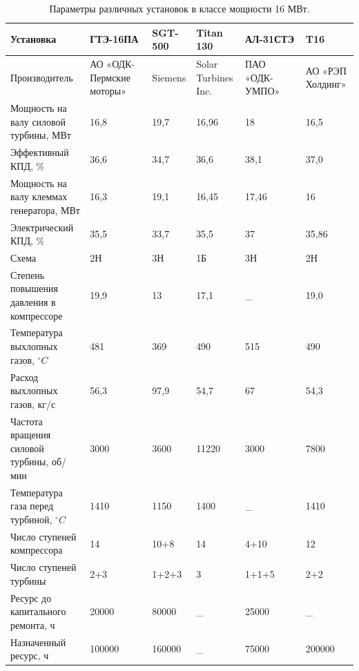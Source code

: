 \documentclass[a4paper,12pt]{article}
\begin{document}
    \begin{longtable}{|p{3.5cm}|p{2.2cm}|p{2.2cm}|p{2.2cm}|p{2.2cm}|p{2.2cm}|}

            \caption{Параметры различных установок в классе мощности 16 МВт.}\\

            \hline \label{engines16MW}
            Установка & ГТЭ-16ПА & SGT-500 & Titan 130 & АЛ-31СТЭ & T16 \\
            \hline
            Производитель & АО «ОДК-Пермские моторы» & Siemens & Solar Turbines Inc. & ПАО «ОДК-УМПО» & АО «РЭП Холдинг» \\
            \hline
            Мощность на валу силовой турбины, МВт &	16,8 & 19,7 & 16,96 &18 & 16,5 \\
            \hline
            Эффективный КПД, \% &	36,6 &	34,7 &	36,6 &	38,1 &	37,0 \\
            \hline
            Мощность на валу клеммах генератора, МВт & 16,3 &	19,1 &	16,45 &	17,46 &	16 \\
            \hline
            Электрический КПД, \% &	35,5 &	33,7 &	35,5 &	37 &	35,86 \\
            \hline
            Схема &	2Н &	3Н &	1Б &	3Н &	2Н \\
            \hline
            Степень повышения давления в компрессоре &	19,9 & 13 & 17,1 & \_ &	19,0 \\
            \hline
            Температура выхлопных газов, $^\circ C$ &	481 &	369 &	490 &	515 &	490 \\
            \hline
            Расход выхлопных газов, кг/с &	56,3 &	97,9 &	54,7 &	67 &	54,3 \\
            \hline
            Частота вращения силовой турбины, об/мин &	3000 &	3600 &	11220 &	3000 &	7800 \\
            \hline
            Температура газа перед турбиной, $^\circ C$ &	1410 &	1150 &	1400 &	\_ &	1410 \\
            \hline
            Число ступеней компрессора &	14 &	10+8 &	14 &	4+10 &	12 \\
            \hline
            Число ступеней турбины &	2+3 &	1+2+3 &	3 &	1+1+5 &	2+2 \\
            \hline
            Ресурс до капитального ремонта, ч & 20000 & 80000 & \_ & 25000 & \_ \\
            \hline
            Назначенный ресурс, ч & 100000 & 160000 & \_ & 75000 & 200000 \\
            \hline
        \end{longtable}
\end{document}
